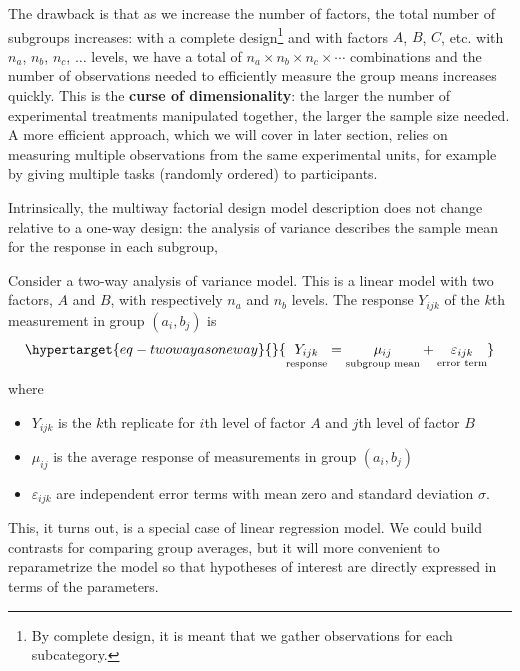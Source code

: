 \documentclass[
  11pt,
  letterpaper,
]{scrbook}
\providecommand{\tightlist}{%
  \setlength{\itemsep}{0pt}\setlength{\parskip}{0pt}}\usepackage{longtable,booktabs,array}
\theoremstyle{definition}
\theoremstyle{remark}
\begin{document}
The drawback is that as we increase the number of factors, the total
number of subgroups increases: with a complete design\footnote{By
  complete design, it is meant that we gather observations for each
  subcategory.} and with factors \(A\), \(B\), \(C\), etc. with \(n_a\),
\(n_b\), \(n_c\), \(\ldots\) levels, we have a total of
\(n_a\times n_b \times n_c \times \cdots\) combinations and the number
of observations needed to efficiently measure the group means increases
quickly. This is the \textbf{curse of dimensionality}: the larger the
number of experimental treatments manipulated together, the larger the
sample size needed. A more efficient approach, which we will cover in
later section, relies on measuring multiple observations from the same
experimental units, for example by giving multiple tasks (randomly
ordered) to participants.

Intrinsically, the multiway factorial design model description does not
change relative to a one-way design: the analysis of variance describes
the sample mean for the response in each subgroup,

Consider a two-way analysis of variance model. This is a linear model
with two factors, \(A\) and \(B\), with respectively \(n_a\) and \(n_b\)
levels. The response \(Y_{ijk}\) of the \(k\)th measurement in group
\((a_i, b_j)\) is
\begin{equation}\protect\hypertarget{eq-twowayasoneway}{}{
\underset{\text{response}\vphantom{b}}{Y_{ijk}} = \underset{\text{subgroup mean}}{\mu_{ij}} + \underset{\text{error term}}{\varepsilon_{ijk}}
}\label{eq-twowayasoneway}\end{equation} where

\begin{itemize}
\tightlist
\item
  \(Y_{ijk}\) is the \(k\)th replicate for \(i\)th level of factor \(A\)
  and \(j\)th level of factor \(B\)
\item
  \(\mu_{ij}\) is the average response of measurements in group
  \((a_i, b_j)\)
\item
  \(\varepsilon_{ijk}\) are independent error terms with mean zero and
  standard deviation \(\sigma\).
\end{itemize}

This, it turns out, is a special case of linear regression model. We
could build contrasts for comparing group averages, but it will more
convenient to reparametrize the model so that hypotheses of interest are
directly expressed in terms of the parameters.
\end{document}
